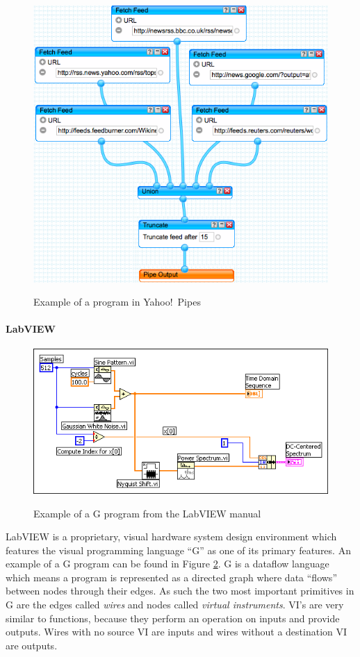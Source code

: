 \documentclass[10pt,conference,compsocconf]{IEEEtran}
\begin{document}
\begin{figure}
\caption{Example of a program in Yahoo!\ Pipes}
\centering
\includegraphics[width=\columnwidth]{yp-1}
\label{fig:ypexample}
\end{figure}


\paragraph{LabVIEW}
\begin{figure}
\caption{Example of a G program from the LabVIEW manual}
\centering
\includegraphics[width=\columnwidth]{labview-1}
\label{fig:labviewexample}
\end{figure}

LabVIEW is a proprietary, visual hardware system design environment which features the visual programming language ``G'' as one of its primary features.
An example of a G program can be found in Figure \ref{fig:labviewexample}.
G is a dataflow language which means a program is represented as a directed graph where data ``flows'' between nodes through their edges.
As such the two most important primitives in G are the edges called \textit{wires} and nodes called \textit{virtual instruments}.
VI's are very similar to functions, because they perform an operation on inputs and provide outputs.
Wires with no source VI are inputs and wires without a destination VI are outputs. 
\end{document}
